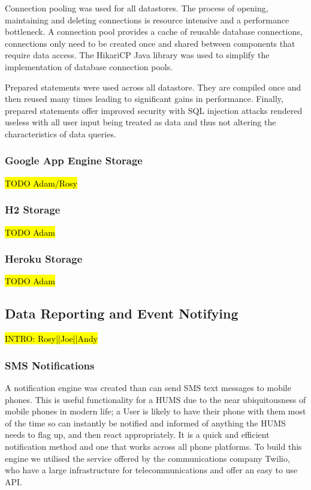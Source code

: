 \documentclass[10pt,a4paper]{article}
\begin{document}
Connection pooling was used for all datastores. The process of opening, maintaining and deleting connections is resource intensive and a performance bottleneck. A connection pool provides a cache of reusable database connections, connections only need to be created once and shared between components that require data access. The HikariCP Java library was used to simplify the implementation of database connection pools. 

Prepared statements were used across all datastore. They are compiled once and then reused many times leading to significant gains in performance. Finally, prepared statements offer improved security with SQL injection attacks rendered useless with all user input being treated as data and thus not altering the characteristics of data queries.

\subsubsection{Google App Engine Storage}
\hl{TODO Adam/Rosy}

\subsubsection{H2 Storage}
\hl{TODO Adam}

\subsubsection{Heroku Storage}
\hl{TODO Adam}

\subsection{Data Reporting and Event Notifying}
\label{sec:report}
\hl{INTRO: Rosy||Joe||Andy}

\subsubsection{SMS Notifications}
A notification engine was created than can send SMS text messages to mobile phones. This is useful functionality for a HUMS due to the near ubiquitousness of mobile phones in modern life; a User is likely to have their phone with them most of the time so can instantly be notified and informed of anything the HUMS needs to flag up, and then react appropriately. It is a quick and efficient notification method and one that works across all phone platforms. To build this engine we utilised the service offered by the communications company Twilio, who have a large infrastructure for telecommunications and offer an easy to use API.
\end{document}
